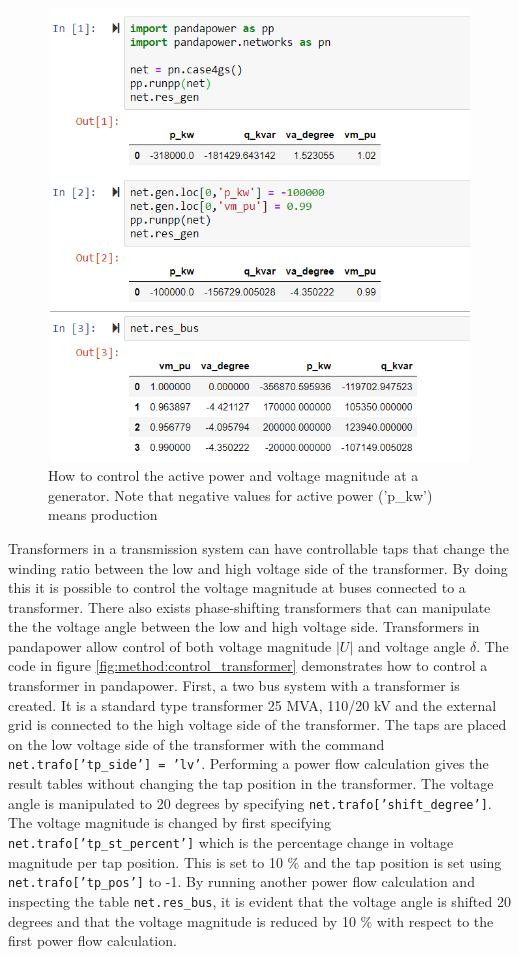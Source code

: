\documentclass[class=book, crop=false]{standalone}
\begin{document}
\begin{figure}[H]
    \center
    \includegraphics[height=12cm, width=12cm]{figures/case4g_controll_vm_p_kw.PNG}
    \caption[size = 9]{How to control the active power and voltage magnitude at a generator. Note that negative values for active power ('p\_kw') means production}
    \label{fig:method:case4g_controll_vm_p_kw}
\end{figure}

Transformers in a transmission system can have controllable taps that change the winding ratio between the low and high voltage side of the transformer. By doing this it is possible to control the voltage magnitude at buses connected to a transformer. There also exists phase-shifting transformers that can manipulate the the voltage angle between the low and high voltage side. Transformers in pandapower allow control of both voltage magnitude $|U|$ and voltage angle $\delta$. The code in figure \ref{fig:method:control_transformer} demonstrates how to control a transformer in pandapower. First, a two bus system with a transformer is created. It is a standard type transformer 25 MVA, 110/20 kV and the external grid is connected to the high voltage side of the transformer. The taps are placed on the low voltage side of the transformer with the command \texttt{net.trafo['tp\_side'] = 'lv'}. Performing a power flow calculation gives the result tables without changing the tap position in the transformer. The voltage angle is manipulated to 20 degrees by specifying \texttt{net.trafo['shift\_degree']}. The voltage magnitude is changed by first specifying \texttt{net.trafo['tp\_st\_percent']} which is the percentage change in voltage magnitude per tap position. This is set to 10 \% and the tap position is set using \texttt{net.trafo['tp\_pos']} to -1. By running another power flow calculation and inspecting the table \texttt{net.res\_bus}, it is evident that the voltage angle is shifted 20 degrees and that the voltage magnitude is reduced by 10 \% with respect to the first power flow calculation. 
\end{document}
